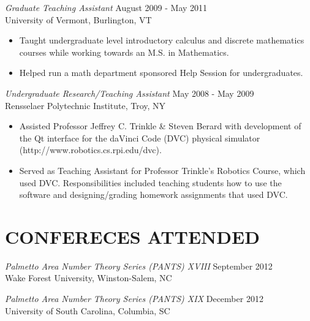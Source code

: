 \documentclass[line,margin]{res}
\begin{document}
\begin{resume}
                  {\sl Graduate Teaching Assistant} \hfill August 2009 - May 2011 \\
                  University of Vermont, Burlington, VT\\
                  \begin{itemize}  \itemsep -2pt %
                  \item
                    Taught undergraduate level introductory calculus and discrete mathematics courses while working towards an M.S. in Mathematics.
                  \item 
                    Helped run a math department sponsored Help Session for undergraduates.
                  \end{itemize}

                  {\sl Undergraduate Research/Teaching Assistant} \hfill May 2008 - May 2009 \\
                  Rensselaer Polytechnic Institute, Troy, NY\\
                  \begin{itemize}  \itemsep -2pt %
                  \item Assisted Professor Jeffrey C. Trinkle \& Steven Berard with development of the Qt interface for the daVinci Code (DVC) physical simulator\\ (http://www.robotics.cs.rpi.edu/dvc).
                  \item Served as Teaching Assistant for Professor Trinkle's Robotics Course, which used DVC.
                    Responsibilities included teaching students how to use the software and designing/grading homework assignments that used DVC.
                  \end{itemize}

                  \section{CONFERECES ATTENDED}
                          {\sl Palmetto Area Number Theory Series (PANTS) XVIII} \hfill September 2012\\
                          Wake Forest University, Winston-Salem, NC
                          
                          {\sl Palmetto Area Number Theory Series (PANTS) XIX} \hfill December 2012\\
                          University of South Carolina, Columbia, SC


\end{resume}
\end{document}
